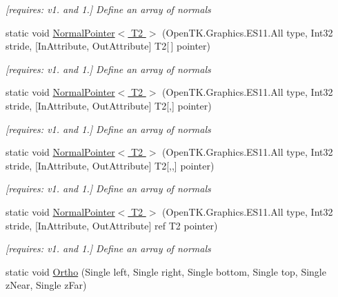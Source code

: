 \begin{DoxyCompactItemize}
\begin{DoxyCompactList}\small\item\em \mbox{[}requires\-: v1. and 1.\mbox{]} Define an array of normals \end{DoxyCompactList}\item 
static void \hyperlink{class_open_t_k_1_1_graphics_1_1_e_s11_1_1_g_l_a0c039e7491cfeaedbfa11219597b4584}{Normal\-Pointer$<$ T2 $>$} (Open\-T\-K.\-Graphics.\-E\-S11.\-All type, Int32 stride, \mbox{[}In\-Attribute, Out\-Attribute\mbox{]} T2\mbox{[}$\,$\mbox{]} pointer)
\begin{DoxyCompactList}\small\item\em \mbox{[}requires\-: v1. and 1.\mbox{]} Define an array of normals \end{DoxyCompactList}\item 
static void \hyperlink{class_open_t_k_1_1_graphics_1_1_e_s11_1_1_g_l_a215789e54c68713b1abf048fbf95d5cd}{Normal\-Pointer$<$ T2 $>$} (Open\-T\-K.\-Graphics.\-E\-S11.\-All type, Int32 stride, \mbox{[}In\-Attribute, Out\-Attribute\mbox{]} T2\mbox{[},\mbox{]} pointer)
\begin{DoxyCompactList}\small\item\em \mbox{[}requires\-: v1. and 1.\mbox{]} Define an array of normals \end{DoxyCompactList}\item 
static void \hyperlink{class_open_t_k_1_1_graphics_1_1_e_s11_1_1_g_l_a4d92149e00d9d5401ba14fb58e05765c}{Normal\-Pointer$<$ T2 $>$} (Open\-T\-K.\-Graphics.\-E\-S11.\-All type, Int32 stride, \mbox{[}In\-Attribute, Out\-Attribute\mbox{]} T2\mbox{[},,\mbox{]} pointer)
\begin{DoxyCompactList}\small\item\em \mbox{[}requires\-: v1. and 1.\mbox{]} Define an array of normals \end{DoxyCompactList}\item 
static void \hyperlink{class_open_t_k_1_1_graphics_1_1_e_s11_1_1_g_l_af86bfbc3b94e5aaaf6ffce6c9ef622c6}{Normal\-Pointer$<$ T2 $>$} (Open\-T\-K.\-Graphics.\-E\-S11.\-All type, Int32 stride, \mbox{[}In\-Attribute, Out\-Attribute\mbox{]} ref T2 pointer)
\begin{DoxyCompactList}\small\item\em \mbox{[}requires\-: v1. and 1.\mbox{]} Define an array of normals \end{DoxyCompactList}\item 
static void \hyperlink{class_open_t_k_1_1_graphics_1_1_e_s11_1_1_g_l_a587ffaea278a702c02da6a51d2777e11}{Ortho} (Single left, Single right, Single bottom, Single top, Single z\-Near, Single z\-Far)

\end{DoxyCompactItemize}
